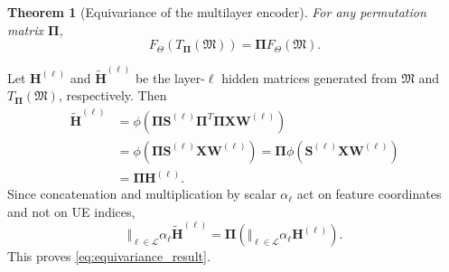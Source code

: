 \documentclass[journal]{IEEEtran}
\newtheorem{theorem}{Theorem}
\begin{document}
\begin{theorem}[Equivariance of the multilayer encoder]
For any permutation matrix $\boldsymbol{\Pi}$,
\begin{equation}
    F_{\Theta}\left(T_{\boldsymbol{\Pi}}(\mathfrak{M})\right)
    =\boldsymbol{\Pi}F_{\Theta}(\mathfrak{M}).
    \label{eq:equivariance_result}
\end{equation}
\end{theorem}
\begin{IEEEproof}
Let $\mathbf{H}^{(\ell)}$ and $\widetilde{\mathbf{H}}^{(\ell)}$ be the
layer-$\ell$ hidden matrices generated from $\mathfrak{M}$ and
$T_{\boldsymbol{\Pi}}(\mathfrak{M})$, respectively. Then
\begin{equation}
\begin{split}
\widetilde{\mathbf{H}}^{(\ell)}
&=\phi\left(\boldsymbol{\Pi}\mathbf{S}^{(\ell)}
\boldsymbol{\Pi}^{T}\boldsymbol{\Pi}\mathbf{X}\mathbf{W}^{(\ell)}\right)\\
&=\phi\left(\boldsymbol{\Pi}\mathbf{S}^{(\ell)}
\mathbf{X}\mathbf{W}^{(\ell)}\right)
=\boldsymbol{\Pi}\phi\left(\mathbf{S}^{(\ell)}
\mathbf{X}\mathbf{W}^{(\ell)}\right)\\
&=\boldsymbol{\Pi}\mathbf{H}^{(\ell)}.
\end{split}
\end{equation}
Since concatenation and multiplication by scalar $\alpha_{\ell}$ act on feature
coordinates and not on UE indices,
\begin{equation}
\Vert_{\ell\in\mathcal{L}}\alpha_{\ell}
\widetilde{\mathbf{H}}^{(\ell)}
=\boldsymbol{\Pi}\left(
\Vert_{\ell\in\mathcal{L}}\alpha_{\ell}\mathbf{H}^{(\ell)}\right).
\end{equation}
This proves \eqref{eq:equivariance_result}.
\end{IEEEproof}
\end{document}
